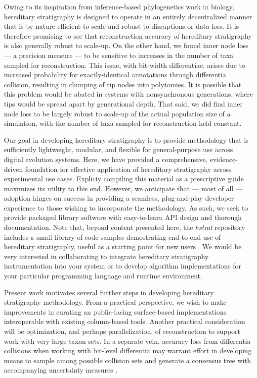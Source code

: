 Owing to its inspiration from inference-based phylogenetics work in biology, hereditary stratigraphy is designed to operate in an entirely decentralized manner that is by nature efficient to scale and robust to disruptions or data loss.
It is therefore promising to see that reconstruction accuracy of hereditary stratigraphy is also generally robust to scale-up.
On the other hand, we found inner node loss --- a precision measure --- to be sensitive to increases in the number of taxa sampled for reconstruction.
This issue, with bit-width differentiae, arises due to increased probability for exactly-identical annotations through differentia collision, resulting in clumping of tip nodes into polytomies.
It is possible that this problem would be abated in systems with nonsynchronous generations, where tips would be spread apart by generational depth.
That said, we did find inner node loss to be largely robust to scale-up of the actual population size of a simulation, with the number of taxa sampled for reconstruction held constant.

Our goal in developing hereditary stratigraphy is to provide methodology that is sufficiently lightweight, modular, and flexible for general-purpose use across digital evolution systems.
Here, we have provided a comprehensive, evidence-driven foundation for effective application of hereditary stratigraphy across experimental use cases.
Expliciy compiling this material as a prescriptive guide maximizes its utility to this end.
However, we anticipate that --- most of all --- adoption hinges on success in providing a seamless, plug-and-play developer experience to those wishing to incorporate the methodology.
As such, we seek to provide packaged library software with easy-to-learn API design and thorough documentation.
Note that, beyond content presented here, the \textit{hstrat} repository includes a small library of code samples demostrating end-to-end use of hereditary stratigraphy, useful as a starting point for new users \citep{moreno2022hstrat}.
We would be very interested in collaborating to integrate hereditary stratigraphy instrumentation into your system or to develop algorithm implementations for your particular programming language and runtime environment.

Present work motivates several further steps in developing hereditary stratigraphy methodology.
From a practical perspective, we wish to make improvements in curating an  public-facing surface-based implementations interoperable with existing column-based tools.
Another practical consideration will be optimization, and perhaps parallelization, of reconstruction to support work with very large taxon sets.
In a separate vein, accuracy loss from differentia collisions when working with bit-level differentia may warrant effort in developing means to sample among possible collision sets and generate a consensus tree with accompanying uncertainty measures \citep{bryant2003classification}.

